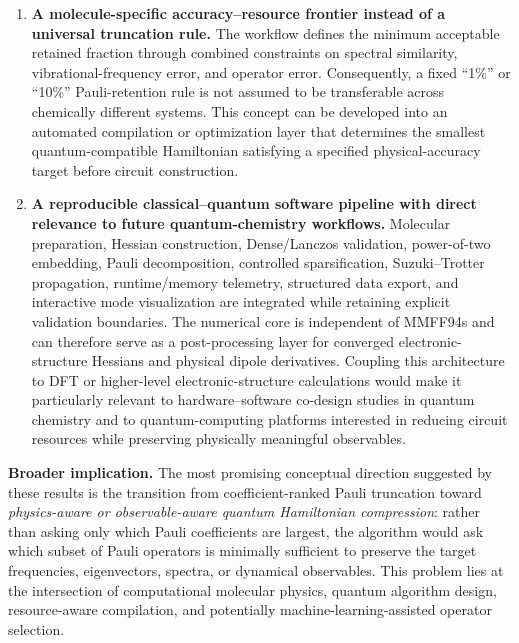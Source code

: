 \documentclass[aip,jcp,reprint,amsmath,amssymb,floatfix]{revtex4-2}
\begin{document}
\begin{enumerate}
    \item \textbf{A molecule-specific accuracy--resource frontier instead of a universal truncation rule.}
    The workflow defines the minimum acceptable retained fraction through combined
    constraints on spectral similarity, vibrational-frequency error, and operator
    error. Consequently, a fixed ``1\%'' or ``10\%'' Pauli-retention rule is not
    assumed to be transferable across chemically different systems. This concept
    can be developed into an automated compilation or optimization layer that
    determines the smallest quantum-compatible Hamiltonian satisfying a specified
    physical-accuracy target before circuit construction.

    \item \textbf{A reproducible classical--quantum software pipeline with direct relevance to future quantum-chemistry workflows.}
    Molecular preparation, Hessian construction, Dense/Lanczos validation,
    power-of-two embedding, Pauli decomposition, controlled sparsification,
    Suzuki--Trotter propagation, runtime/memory telemetry, structured data export,
    and interactive mode visualization are integrated while retaining explicit
    validation boundaries. The numerical core is independent of MMFF94s and can
    therefore serve as a post-processing layer for converged electronic-structure
    Hessians and physical dipole derivatives. Coupling this architecture to DFT
    or higher-level electronic-structure calculations would make it particularly
    relevant to hardware--software co-design studies in quantum chemistry and to
    quantum-computing platforms interested in reducing circuit resources while
    preserving physically meaningful observables.
\end{enumerate}

\textbf{Broader implication.} The most promising conceptual direction suggested by
these results is the transition from coefficient-ranked Pauli truncation toward
\emph{physics-aware or observable-aware quantum Hamiltonian compression}: rather
than asking only which Pauli coefficients are largest, the algorithm would ask
which subset of Pauli operators is minimally sufficient to preserve the target
frequencies, eigenvectors, spectra, or dynamical observables. This problem lies at
the intersection of computational molecular physics, quantum algorithm design,
resource-aware compilation, and potentially machine-learning-assisted operator
selection.
\endgroup
\end{document}
